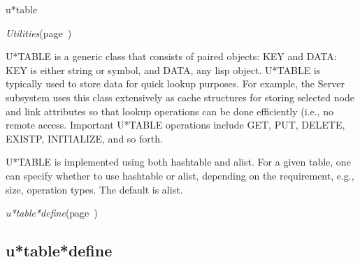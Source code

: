 \begin{description}
\item [Name:]  u*table

\item [Layer:] {\sl Utilities}\hfill(page~\pageref{Utilities})

\item [Description:]
U*TABLE is a generic class that consists of paired objects: KEY and
DATA: KEY is either string or symbol, and DATA, any lisp object.
U*TABLE is typically used to store data for quick lookup purposes. For
example, the Server subsystem uses this class extensively as cache
structures for storing selected node and link attributes so that
lookup operations can be done efficiently (i.e., no remote access.
Important U*TABLE operations include GET, PUT, DELETE, EXISTP,
INITIALIZE, and so forth.

U*TABLE is implemented using both hashtable and alist. For a given
table, one can specify whether to use hashtable or alist, depending on
the requirement, e.g., size, operation types. The default is alist. 

\item [Attributes:]

\item [Operations:]
\item {\sl u*table*define}\hfill(page~\pageref{u*table*define})

\item [Collections:]

\item [Subclasses:]

\item [Superclasses:]



\end{description}
\horizontalline

\subsection{u*table*define}
\label{u*table*define}

